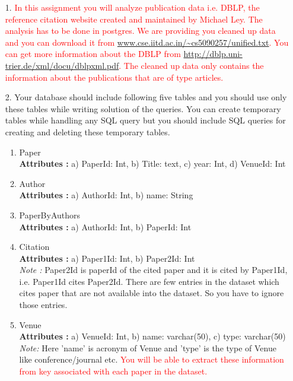\documentclass[10pt]{article}
\begin{document}
\begin{itemize}

\item[1.] \textcolor{red}{In this assignment you will analyze publication data i.e. DBLP, the reference citation website created and maintained by Michael Ley. The analysis has to  be done in postgres. We are providing you cleaned up data and you can download it from  \url{www.cse.iitd.ac.in/~cs5090257/unified.txt}. You can get more information about the DBLP from \url{http://dblp.uni-trier.de/xml/docu/dblpxml.pdf}. The cleaned up data only contains the information about the publications that are of type articles. }

\item[2.] Your database should include following five tables and you should use only these tables while writing solution of the queries. You can create temporary tables while handling any SQL query but you should include SQL queries for creating and deleting these temporary tables.

\begin{enumerate}
\item Paper\\
	\textbf{Attributes :}  a) PaperId: Int, b) Title: text, c) year: Int, d) VenueId: Int
\item Author\\
	\textbf{Attributes :} a) AuthorId: Int, b) name: String
	
\item PaperByAuthors\\
	\textbf{Attributes :} a) AuthorId: Int, b) PaperId: Int
	
\item Citation\\
	\textbf{Attributes :} a) Paper1Id: Int, b) Paper2Id: Int\\
\emph{Note :} Paper2Id is paperId of the cited paper and it is cited by Paper1Id, i.e. Paper1Id cites Paper2Id. There are few entries in the dataset which cites paper that are not available into the dataset. So you have to ignore those entries.

\item Venue\\
	\textbf{Attributes :} a) VenueId: Int, b) name: varchar(50), c) type: varchar(50)\\
\emph{Note:} Here 'name' is acronym of Venue and 'type' is the type of Venue like conference/journal etc. 
\textcolor{red}{You will be able to extract these information from key associated with each paper in the dataset.}
\end{enumerate}

\end{itemize}
\end{document}
